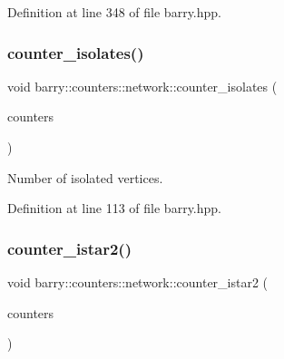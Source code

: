 Definition at line 348 of file barry.\+hpp.

\mbox{\label{namespacebarry_1_1counters_1_1network_a16449353394312feed59aa5444d17dad}} 
\subsubsection{\texorpdfstring{counter\+\_\+isolates()}{counter\_isolates()}}
{\footnotesize\ttfamily void barry\+::counters\+::network\+::counter\+\_\+isolates (\begin{DoxyParamCaption}\item[{\hyperlink{namespacebarry_1_1counters_1_1network_a3b3c590303d47840d1967372ae495d95}{Net\+Counter\+Vector} $\ast$}]{counters }\end{DoxyParamCaption})\hspace{0.3cm}{\ttfamily [inline]}}



Number of isolated vertices. 



Definition at line 113 of file barry.\+hpp.

\mbox{\label{namespacebarry_1_1counters_1_1network_a95eea8464d85c595efa305cdf9a5a82b}} 
\subsubsection{\texorpdfstring{counter\+\_\+istar2()}{counter\_istar2()}}
{\footnotesize\ttfamily void barry\+::counters\+::network\+::counter\+\_\+istar2 (\begin{DoxyParamCaption}\item[{\hyperlink{namespacebarry_1_1counters_1_1network_a3b3c590303d47840d1967372ae495d95}{Net\+Counter\+Vector} $\ast$}]{counters }\end{DoxyParamCaption})\hspace{0.3cm}{\ttfamily [inline]}}



